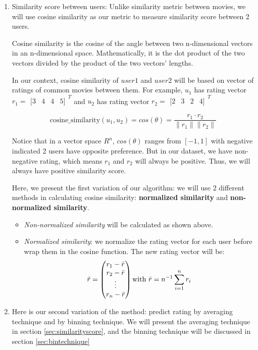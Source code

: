 \documentclass{article}
\begin{document}
\begin{enumerate}[label=\alph*.]  
    \item Similarity score between users: Unlike similarity metric between movies, we will use cosine similarity as our metric to measure similarity score between 2 users. 
    
    Cosine similarity is the cosine of the angle between two n-dimensional vectors in an n-dimensional space. Mathematically, it is the dot product of the two vectors divided by the product of the two vectors' lengths.

    In our context, cosine similarity of $user 1$ and $user 2$  will be based on vector of ratings of common movies between them. For example, \(u_1\) has rating vector \(r_1 = \begin{matrix}[3 & 4 & 4 & 5]\end{matrix}^T\) and \(u_2\) has rating vector \(r_2 = \begin{matrix}[2 & 3 & 2 & 4]\end{matrix}^T\)
    
    \[
    \text{cosine\_similarity}(u_1, u_2) = cos(\theta) = \frac{r_1 \cdot r_2}{\|r_1\| \|r_2\|}
    \]

    Notice that in a vector space \(R^n\), \(cos(\theta)\) ranges from \([-1, 1]\) with negative indicated 2 users have opposite preference. But in our dataset, we have non-negative rating, which means \(r_1\) and \(r_2\) will always be positive. Thus, we will always have positive similarity score. 
    
    Here, we present the first variation of our algorithm: we will use 2 different methods in calculating cosine similarity: \textbf{normalized similarity} and \textbf{non-normalized similarity}.

    \begin{itemize}
        \item \textit{Non-normalized similarity} will be calculated as shown above.

        \item \textit{Normalized similarity}: we normalize the rating vector for each user before wrap them in the cosine function. The new rating vector will be: 
        \[
        \tilde{r} = 
        \begin{pmatrix}
            r_1 - \bar{r} \\
            r_2 - \bar{r} \\
            \vdots \\
            r_n - \bar{r}
        \end{pmatrix} \\
        \text{with } \bar{r} = n^{-1} \sum_{i=1}^{n}{r_i}
        \]
    \end{itemize}

    \item Here is our second variation of the method: predict rating by averaging technique and by binning technique. We will present the averaging technique in section \ref{sec:similarityscore}, and the binning technique will be discussed in section \ref{sec:bintechnique}
    
\end{enumerate}
\end{document}
